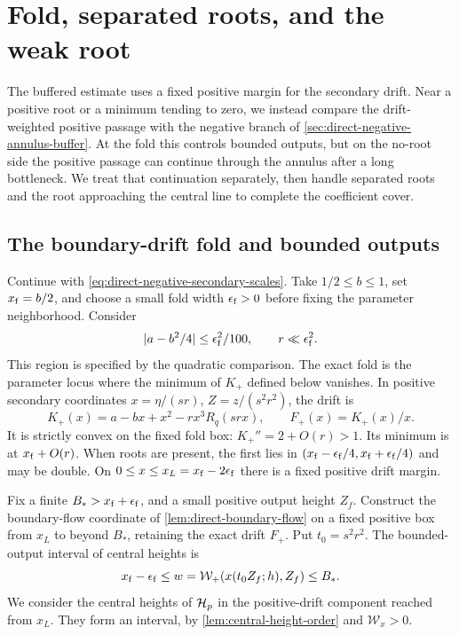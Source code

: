 \section{Fold, separated roots, and the weak root}
\label{sec:direct-negative-root-regimes}

The buffered estimate uses a fixed positive margin for the secondary
drift. Near a positive root or a minimum tending to zero, we instead
compare the drift-weighted positive passage with the negative branch
of \cref{sec:direct-negative-annulus-buffer}. At the fold this controls
bounded outputs, but on the no-root side the positive passage can
continue through the annulus after a long bottleneck. We treat that
continuation separately, then handle separated roots and the root
approaching the central line to complete the coefficient cover.

\subsection{The boundary-drift fold and bounded outputs}
\label{sec:direct-negative-fold}

Continue with \eqref{eq:direct-negative-secondary-scales}.
Take \(1/2\le b\le1\), set \(x_{\rm f}=b/2\), and choose a small
fold width \(\epsilon_{\rm f}>0\) before fixing the parameter neighborhood.
Consider
\begin{equation}
\label{eq:direct-fold-region}
 |a-b^2/4|\le\epsilon_{\rm f}^2/100,\qquad r\ll\epsilon_{\rm f}^2 .
\end{equation}
This region is specified by the quadratic comparison. The exact fold
is the parameter locus where the minimum of \(K_+\) defined below
vanishes.
In positive secondary coordinates \(x=\eta/(sr)\),
\(Z=z/(s^2r^2)\), the drift is
\[
 K_+(x)=a-bx+x^2-rx^3R_q(srx),\qquad F_+(x)=K_+(x)/x .
\]
It is strictly convex on the fixed fold box:
\(K_+''=2+O(r)>1\).
Its minimum is at \(x_{\rm f}+O(r)\). When roots are present, the first
lies in \((x_{\rm f}-\epsilon_{\rm f}/4,x_{\rm f}+\epsilon_{\rm f}/4)\) and may be double.
On \(0\le x\le x_L=x_{\rm f}-2\epsilon_{\rm f}\) there is a fixed positive
drift margin.

Fix a finite \(B_*>x_{\rm f}+\epsilon_{\rm f}\), and a small positive output
height \(Z_f\). Construct the boundary-flow coordinate
of \cref{lem:direct-boundary-flow} on a fixed positive
box from \(x_L\) to beyond \(B_*\), retaining the exact
drift \(F_+\). Put \(t_0=s^2r^2\). The bounded-output
interval of central heights is
\begin{equation}
\label{eq:direct-fold-bounded-output}
 x_{\rm f}-\epsilon_{\rm f}\le w=\mathcal W_+(x(t_0Z_f;h),Z_f)\le B_* .
\end{equation}
We consider the central heights of \(\mathcal H_p\) in the positive-drift
component reached from \(x_L\). They form an interval, by
\cref{lem:central-height-order} and \(\mathcal W_x>0\).

